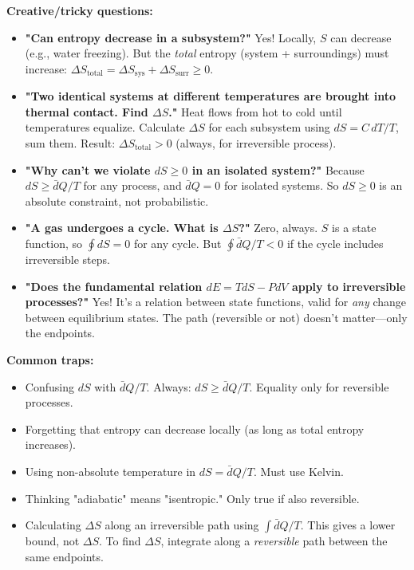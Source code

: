 \documentclass[9pt,twocoloumn]{article}
\begin{document}
\textbf{Creative/tricky questions:}

\begin{itemize}
    \item \textbf{"Can entropy decrease in a subsystem?"} Yes! Locally, $S$ can decrease (e.g., water freezing). But the \emph{total} entropy (system + surroundings) must increase: $\Delta S_{\text{total}} = \Delta S_{\text{sys}} + \Delta S_{\text{surr}} \geq 0$.

    \item \textbf{"Two identical systems at different temperatures are brought into thermal contact. Find $\Delta S$."} Heat flows from hot to cold until temperatures equalize. Calculate $\Delta S$ for each subsystem using $dS = C \, dT/T$, sum them. Result: $\Delta S_{\text{total}} > 0$ (always, for irreversible process).

    \item \textbf{"Why can't we violate $dS \geq 0$ in an isolated system?"} Because $dS \geq \bar{d}Q/T$ for any process, and $\bar{d}Q = 0$ for isolated systems. So $dS \geq 0$ is an absolute constraint, not probabilistic.

    \item \textbf{"A gas undergoes a cycle. What is $\Delta S$?"} Zero, always. $S$ is a state function, so $\oint dS = 0$ for any cycle. But $\oint \bar{d}Q/T < 0$ if the cycle includes irreversible steps.

    \item \textbf{"Does the fundamental relation $dE = T dS - P dV$ apply to irreversible processes?"} Yes! It's a relation between state functions, valid for \emph{any} change between equilibrium states. The path (reversible or not) doesn't matter—only the endpoints.
\end{itemize}

\textbf{Common traps:}

\begin{itemize}
    \item Confusing $dS$ with $\bar{d}Q/T$. Always: $dS \geq \bar{d}Q/T$. Equality only for reversible processes.
    \item Forgetting that entropy can decrease locally (as long as total entropy increases).
    \item Using non-absolute temperature in $dS = \bar{d}Q/T$. Must use Kelvin.
    \item Thinking "adiabatic" means "isentropic." Only true if also reversible.
    \item Calculating $\Delta S$ along an irreversible path using $\int \bar{d}Q/T$. This gives a lower bound, not $\Delta S$. To find $\Delta S$, integrate along a \emph{reversible} path between the same endpoints.
\end{itemize}
\end{document}
